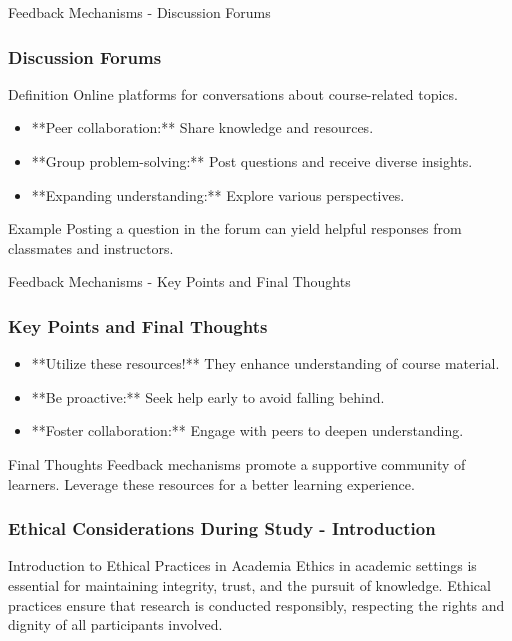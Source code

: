 \documentclass[aspectratio=169]{beamer}
\begin{document}
\begin{frame}[fragile]{Feedback Mechanisms - Discussion Forums}
    \frametitle{Discussion Forums}
    \begin{block}{Definition}
        Online platforms for conversations about course-related topics.
    \end{block}
    \begin{itemize}
        \item **Peer collaboration:** Share knowledge and resources.
        \item **Group problem-solving:** Post questions and receive diverse insights.
        \item **Expanding understanding:** Explore various perspectives.
    \end{itemize}
    \begin{block}{Example}
        Posting a question in the forum can yield helpful responses from classmates and instructors.
    \end{block}
\end{frame}

\begin{frame}[fragile]{Feedback Mechanisms - Key Points and Final Thoughts}
    \frametitle{Key Points and Final Thoughts}
    \begin{itemize}
        \item **Utilize these resources!** They enhance understanding of course material.
        \item **Be proactive:** Seek help early to avoid falling behind.
        \item **Foster collaboration:** Engage with peers to deepen understanding.
    \end{itemize}
    \begin{block}{Final Thoughts}
        Feedback mechanisms promote a supportive community of learners. Leverage these resources for a better learning experience.
    \end{block}
\end{frame}

\begin{frame}[fragile]
    \frametitle{Ethical Considerations During Study - Introduction}
    \begin{block}{Introduction to Ethical Practices in Academia}
        Ethics in academic settings is essential for maintaining integrity, trust, and the pursuit of knowledge. Ethical practices ensure that research is conducted responsibly, respecting the rights and dignity of all participants involved.
    \end{block}
\end{frame}
\end{document}
